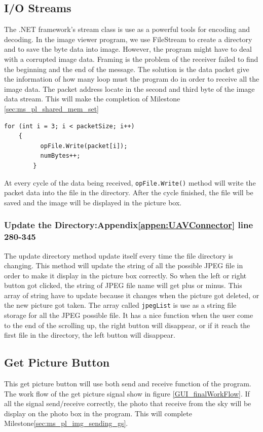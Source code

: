 \subsection{I/O Streams}
    The .NET framework's stream class is use as a powerful tools for encoding and decoding\cite{davidB}. In the image viewer program, we use FileStream to create a directory and to save the byte data into image. However, the program might have to deal with a corrupted image data. Framing is the problem of the receiver failed to find the beginning and the end of the message. The solution is the data packet give the information of how many loop must the program do in order to receive all the image data. The packet address locate in the second and third byte of the image data stream. This will make the completion of Milestone \ref{sec:ms_pl_shared_mem_set}
    
\begin{lstlisting}[caption={writing binary file},label=lst:writingb]          
	for (int i = 3; i < packetSize; i++)
	{
          opFile.Write(packet[i]);
          numBytes++;
    	}
\end{lstlisting}         

At every cycle of the data being received, \texttt{opFile.Write()} method will write the packet data into the file in the directory. After the cycle finished, the file will be saved and the image will be displayed in the picture box. 

\subsubsection*{Update the Directory:Appendix\ref{appen:UAVConnector} line 280-345}
The update directory method update itself every time the file directory is changing. This method will update the string of all the possible JPEG file in order to make it display in the picture box correctly. So when the left or right button got clicked, the string of JPEG file name will get plus or minus. This array of string have to update because it changes when the picture got deleted, or the new picture got taken. The array called \texttt{jpegList} is use as a string file storage for all the JPEG possible file. It has a nice function when the user come to the end of the scrolling up, the right button will disappear, or if it reach the first file in the directory, the left button will disappear. 
\subsection{Get Picture Button}
This get picture button will use both send and receive function of the program. 
The work flow of the get picture signal show in figure \ref{GUI_finalWorkFlow}.
If all the signal send/receive correctly, the photo that receive from the sky will be display on the photo box in the program.
This will complete Milestone\ref{sec:ms_pl_img_sending_gs}.

